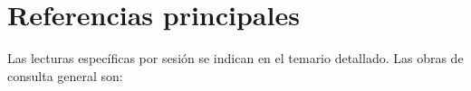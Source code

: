 \documentclass[11pt,letterpaper]{article}
\begin{document}
\section{Referencias principales}

Las lecturas específicas por sesión se indican en el temario detallado. Las obras de consulta general son:

\nocite{wickham2023r4ds, wickham2019advr, wickham2016ggplot2, wickham2021mastering-shiny, rcoreteam-intro, bryan-happygit, ushey-renv, silge-tidytext, croissant-plm, robinson-broom, arelbundock-modelsummary, gohel-officer, gohel-flextable, bryan-googledrive, hester-gmailr, bslib-docs, kunst-highcharter, sievert-plotly, wickham-ellmer, wickham-httr2}

\printbibliography[heading=none]
\end{document}
